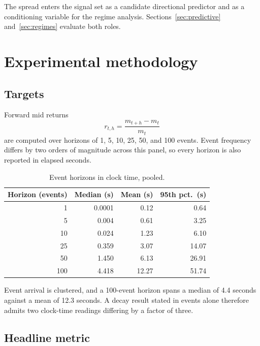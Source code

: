\documentclass[11pt]{scrartcl}
\begin{document}
The spread enters the signal set as a candidate directional predictor and as a conditioning variable for the regime analysis. Sections~\ref{sec:predictive} and~\ref{sec:regimes} evaluate both roles.

\section{Experimental methodology}
\label{sec:method}

\subsection{Targets}
\label{sec:targets}

Forward mid returns
\begin{equation}
r_{t,h} = \frac{m_{t+h} - m_t}{m_t}
\label{eq:fwd}
\end{equation}
are computed over horizons of 1, 5, 10, 25, 50, and 100 events. Event frequency differs by two orders of magnitude across this panel, so every horizon is also reported in elapsed seconds.

\begin{table}[H]
\centering
\caption{Event horizons in clock time, pooled.}
\label{tab:clock}
\begin{tabular}{rrrr}
\toprule
Horizon (events) & Median (s) & Mean (s) & 95th pct.\ (s) \\
\midrule
1   & 0.0001 & 0.12  & 0.64 \\
5   & 0.004  & 0.61  & 3.25 \\
10  & 0.024  & 1.23  & 6.10 \\
25  & 0.359  & 3.07  & 14.07 \\
50  & 1.450  & 6.13  & 26.91 \\
100 & 4.418  & 12.27 & 51.74 \\
\bottomrule
\end{tabular}
\end{table}

Event arrival is clustered, and a 100-event horizon spans a median of 4.4 seconds against a mean of 12.3 seconds. A decay result stated in events alone therefore admits two clock-time readings differing by a factor of three.

\subsection{Headline metric}
\label{sec:metric}
\end{document}

